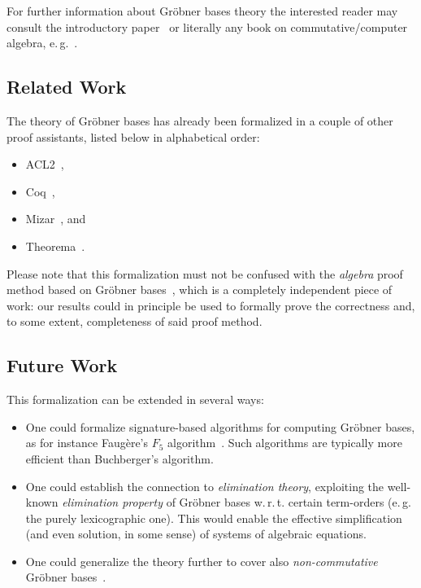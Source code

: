 \documentclass[11pt,a4paper]{article}
\begin{document}
For further information about Gr\"obner bases theory the interested reader may consult the 
introductory paper~\cite{Buchberger1998a} or literally any book on 
commutative/computer algebra, e.\,g.~\cite{Adams1994,Kreuzer2000}.

\subsection{Related Work}

The theory of Gr\"obner bases has already been formalized in a couple of other 
proof assistants, listed below in alphabetical order:
\begin{itemize}
 \item ACL2~\cite{Medina-Bulo2010},
 \item Coq~\cite{Thery2001,Jorge2009},
 \item Mizar~\cite{Schwarzweller2006}, and
 \item Theorema~\cite{Buchberger2003,Maletzky2016b}.
\end{itemize}

Please note that this formalization must not be confused with the 
\textit{algebra} proof method based on Gr\"obner bases~\cite{Chaieb2007}, which 
is a completely independent piece of work: our results could in principle be 
used to formally prove the correctness and, to some extent, completeness of 
said proof method.

\subsection{Future Work}

This formalization can be extended in several ways:
\begin{itemize}
 \item One could formalize signature-based algorithms for computing Gr\"obner bases, as for 
instance Faug\`ere's $F_5$ algorithm~\cite{Faugere2002}. Such algorithms are typically more 
efficient than Buchberger's algorithm.

 \item One could establish the connection to \emph{elimination theory}, 
exploiting the well-known \emph{elimination property} of Gr\"obner bases 
w.\,r.\,t. certain term-orders (e.\,g. the purely lexicographic one). This 
would enable the effective simplification (and even solution, in some sense) of
systems of algebraic equations.

 \item One could generalize the theory further to cover also \emph{non-commutative} Gr\"obner 
bases~\cite{Mora1994}.
\end{itemize}





\end{document}
